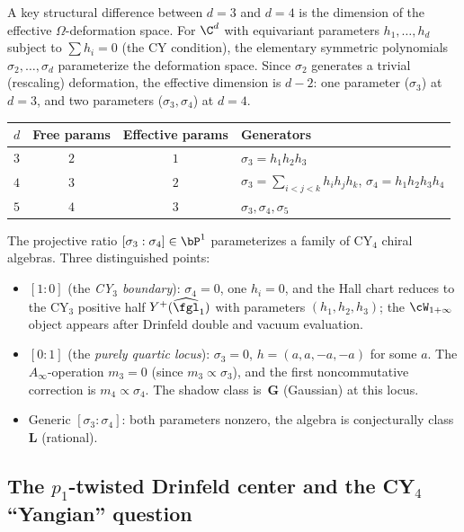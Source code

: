 A key structural difference between $d = 3$ and $d = 4$ is the dimension of the effective $\Omega$-deformation space. For $\C^d$ with equivariant parameters $h_1, \ldots, h_d$ subject to $\sum h_i = 0$ (the CY condition), the elementary symmetric polynomials $\sigma_2, \ldots, \sigma_d$ parameterize the deformation space. Since $\sigma_2$ generates a trivial (rescaling) deformation, the effective dimension is $d - 2$: one parameter ($\sigma_3$) at $d = 3$, and two parameters ($\sigma_3, \sigma_4$) at $d = 4$.

\begin{center}
\renewcommand{\arraystretch}{1.3}
\begin{tabular}{lccl}
 \toprule
 $d$ & Free params & Effective params & Generators \\
 \midrule
 $3$ & $2$ & $1$ & $\sigma_3 = h_1 h_2 h_3$ \\
 $4$ & $3$ & $2$ & $\sigma_3 = \sum_{i<j<k} h_i h_j h_k$, \; $\sigma_4 = h_1 h_2 h_3 h_4$ \\
 $5$ & $4$ & $3$ & $\sigma_3, \sigma_4, \sigma_5$ \\
 \bottomrule
\end{tabular}
\end{center}

The projective ratio $[\sigma_3 : \sigma_4] \in \bP^1$ parameterizes a family of CY$_4$ chiral algebras. Three distinguished points:
\begin{itemize}
 \item $[1 : 0]$ (the \emph{CY$_3$ boundary}): $\sigma_4 = 0$, one $h_i = 0$, and the Hall chart reduces to the CY$_3$ positive half \(Y^+(\widehat{\fgl}_1)\) with parameters $(h_1,h_2,h_3)$; the $\cW_{1+\infty}$ object appears after Drinfeld double and vacuum evaluation.
 \item $[0 : 1]$ (the \emph{purely quartic locus}): $\sigma_3 = 0$, $h = (a, a, -a, -a)$ for some $a$. The $A_\infty$-operation $m_3 = 0$ (since $m_3 \propto \sigma_3$), and the first noncommutative correction is $m_4 \propto \sigma_4$. The shadow class is~$\mathbf{G}$ (Gaussian) at this locus.
 \item Generic $[\sigma_3 : \sigma_4]$: both parameters nonzero, the algebra is conjecturally class~$\mathbf{L}$ (rational).
\end{itemize}


\subsection{The \texorpdfstring{$p_1$}{p-1}-twisted Drinfeld center and the CY\texorpdfstring{$_4$}{-4} ``Yangian'' question}
\label{subsec:cy4-twisted-center}

